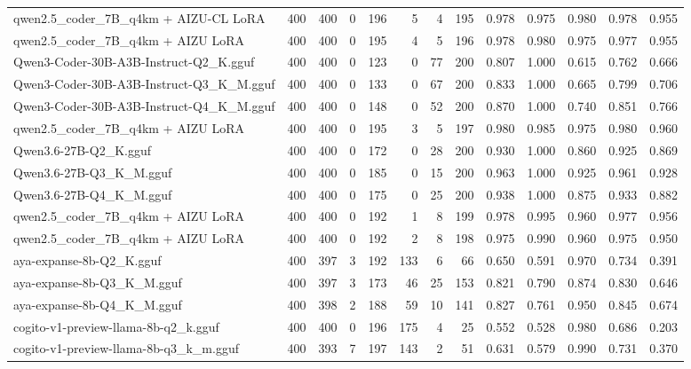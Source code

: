 \begin{table}[htbp]
{\begin{tabular}{lrrrrrrrrrrrr}
    qwen2.5\_coder\_7B\_q4km + AIZU-CL LoRA & 400 & 400 & 0 & 196 & 5 & 4 & 195 & 0.978 & 0.975 & 0.980 & 0.978 & \cellcolor{green!30}0.955 \\
    qwen2.5\_coder\_7B\_q4km + AIZU LoRA & 400 & 400 & 0 & 195 & 4 & 5 & 196 & 0.978 & 0.980 & 0.975 & 0.977 & \cellcolor{green!20}0.955 \\
    Qwen3-Coder-30B-A3B-Instruct-Q2\_K.gguf & 400 & 400 & 0 & 123 & 0 & 77 & 200 & 0.807 & 1.000 & 0.615 & 0.762 & 0.666 \\
    Qwen3-Coder-30B-A3B-Instruct-Q3\_K\_M.gguf & 400 & 400 & 0 & 133 & 0 & 67 & 200 & 0.833 & 1.000 & 0.665 & 0.799 & 0.706 \\
    Qwen3-Coder-30B-A3B-Instruct-Q4\_K\_M.gguf & 400 & 400 & 0 & 148 & 0 & 52 & 200 & 0.870 & 1.000 & 0.740 & 0.851 & 0.766 \\
    qwen2.5\_coder\_7B\_q4km + AIZU LoRA & 400 & 400 & 0 & 195 & 3 & 5 & 197 & 0.980 & 0.985 & 0.975 & 0.980 & \cellcolor{green!50}0.960 \\
    Qwen3.6-27B-Q2\_K.gguf & 400 & 400 & 0 & 172 & 0 & 28 & 200 & 0.930 & 1.000 & 0.860 & 0.925 & 0.869 \\
    Qwen3.6-27B-Q3\_K\_M.gguf & 400 & 400 & 0 & 185 & 0 & 15 & 200 & 0.963 & 1.000 & 0.925 & 0.961 & 0.928 \\
    Qwen3.6-27B-Q4\_K\_M.gguf & 400 & 400 & 0 & 175 & 0 & 25 & 200 & 0.938 & 1.000 & 0.875 & 0.933 & 0.882 \\
    qwen2.5\_coder\_7B\_q4km + AIZU LoRA & 400 & 400 & 0 & 192 & 1 & 8 & 199 & 0.978 & 0.995 & 0.960 & 0.977 & \cellcolor{green!40}0.956 \\
    qwen2.5\_coder\_7B\_q4km + AIZU LoRA & 400 & 400 & 0 & 192 & 2 & 8 & 198 & 0.975 & 0.990 & 0.960 & 0.975 & \cellcolor{green!10}0.950 \\
    aya-expanse-8b-Q2\_K.gguf & 400 & 397 & 3 & 192 & 133 & 6 & 66 & 0.650 & 0.591 & 0.970 & 0.734 & 0.391 \\
    aya-expanse-8b-Q3\_K\_M.gguf & 400 & 397 & 3 & 173 & 46 & 25 & 153 & 0.821 & 0.790 & 0.874 & 0.830 & 0.646 \\
    aya-expanse-8b-Q4\_K\_M.gguf & 400 & 398 & 2 & 188 & 59 & 10 & 141 & 0.827 & 0.761 & 0.950 & 0.845 & 0.674 \\
    cogito-v1-preview-llama-8b-q2\_k.gguf & 400 & 400 & 0 & 196 & 175 & 4 & 25 & 0.552 & 0.528 & 0.980 & 0.686 & 0.203 \\
    cogito-v1-preview-llama-8b-q3\_k\_m.gguf & 400 & 393 & 7 & 197 & 143 & 2 & 51 & 0.631 & 0.579 & 0.990 & 0.731 & 0.370 \\

\end{tabular}}
\end{table}
